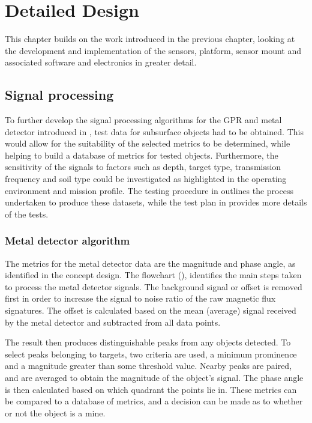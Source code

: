 \documentclass[main.tex]{subfiles}
\begin{document}
\chapter{Detailed Design}

This chapter builds on the work introduced in the previous chapter, looking at the development and implementation of the sensors, platform, sensor mount and associated software and electronics in greater detail. 

\section{Signal processing}
To further develop the signal processing algorithms for the GPR and metal detector introduced in , test data for subsurface objects had to be obtained. This would allow for the suitability of the selected metrics to be determined, while helping to build a database of metrics for tested objects. Furthermore, the sensitivity of the signals to factors such as depth, target type, transmission frequency and soil type could be investigated as highlighted in the operating environment and mission profile.  The testing procedure in  outlines the process undertaken to produce these datasets, while the test plan in  provides more details of the tests. 

\subsection{Metal detector algorithm}
The metrics for the metal detector data are the magnitude and phase angle, as identified in the concept design. The flowchart (), identifies the main steps taken to process the metal detector signals. The background signal or offset is removed first in order to increase the signal to noise ratio of the raw magnetic flux signatures. The offset is calculated based on the mean (average) signal received by the metal detector and subtracted from all data points. 

The result then produces distinguishable peaks from any objects detected. To select peaks belonging to targets, two criteria are used, a minimum prominence and a magnitude greater than some threshold value. Nearby peaks are paired, and are averaged to obtain the magnitude of the object’s signal. The phase angle is then calculated based on which quadrant the points lie in. These metrics can be compared to a database of metrics, and a decision can be made as to whether or not the object is a mine. 
\end{document}
